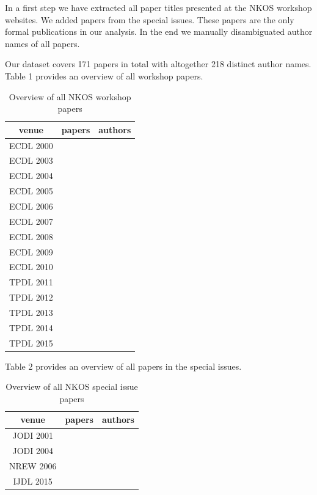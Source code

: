 \documentclass[runningheads,a4paper]{llncs}
\begin{document}
In a first step we have extracted all paper titles presented at the NKOS workshop websites. We added papers from the special issues. These papers are the only formal publications in our analysis.  In the end we manually disambiguated author names of all papers.

Our dataset covers 171 papers in total with altogether 218 distinct author names. Table 1 provides an overview of all workshop papers. 

\begin{table}
	\caption{Overview of all NKOS workshop papers}
\begin{tabular}	{|c|c|c|}		%
	\hline 
	venue& papers  & authors  \\ 
	\hline 
	ECDL 2000&  &  \\ 
	\hline 
	ECDL 2003&  &  \\ 
	\hline 
	ECDL 2004&  &  \\ 
	\hline 
	ECDL 2005&  &  \\ 
	\hline 
	ECDL 2006&  &  \\ 
	\hline 
	ECDL 2007&  &  \\ 
	\hline 
	ECDL 2008&  &  \\ 
	\hline 
	ECDL 2009&  &  \\ 
	\hline 
	ECDL 2010&  &  \\ 
	\hline 
	TPDL 2011&  &  \\ 
	\hline 
	TPDL 2012&  &  \\ 
	\hline 
	TPDL 2013&  &  \\ 
	\hline 
	TPDL 2014&  &  \\ 
	\hline 
	TPDL 2015&  &  \\ 
	\hline 
\end{tabular} 
\label{tab:workshops}
\end{table}


Table 2 provides an overview of all papers in the special issues. 

\begin{table}
	\caption{Overview of all NKOS special issue papers}
\begin{tabular}{|c|c|c|}  %
	\hline 
	venue& papers  & authors  \\ 
	\hline 
	JODI 2001 \cite{Hill2001} &  &  \\ 
	\hline 
	JODI 2004 \cite{Tudhope2004} &  &  \\ 
	\hline 
	NREW 2006 \cite{Tudhope2006} &  &  \\ 
	\hline 
	IJDL 2015 \cite{Mayr2016} &  &  \\ 
	\hline 
\end{tabular} 
\label{tab:SI}
\end{table}
\end{document}
